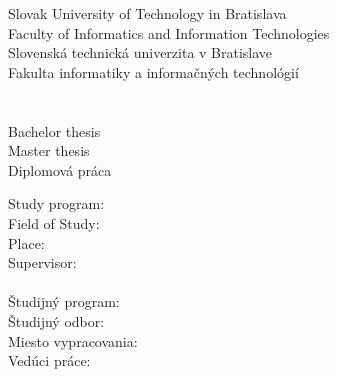 \newpage
\begin{center}
\thispagestyle{empty}
{
	{\Large Slovak University of Technology in Bratislava}\textbf{}\\
	{\Large Faculty of Informatics and Information Technologies}\textbf{}\\[\baselineskip]
}
{
	{\Large Slovenská technická univerzita v Bratislave}\textbf{}\\
	{\Large Fakulta informatiky a informačných technológií}\textbf{}\\[\baselineskip]
}
\vspace*{5cm}
{\Large \Author}\textbf{}\\[\baselineskip]
{\huge \Title}\textbf{}\\[\baselineskip]
{
	{
		{\large Bachelor thesis}\\
	}
	{
		{\large Master thesis}\\
	}
}
{
	{\large Diplomová práca}\\
}
\end{center}
\vspace*{4.5cm}
{
	Study program: \Program\\ 
	Field of Study: \Field\\
	Place: \Place\\
	Supervisor: \Supervisor \\\\
}
{
	Študijný program: \Program\\ 
	Študijný odbor: \Field\\
	Miesto vypracovania: \Place\\
	Vedúci práce: \Supervisor \\\\
}
\Month\ \Year